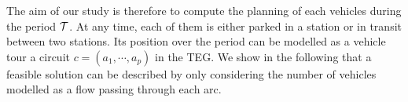 %
%
%
%

The aim of our study is therefore to compute the planning of each vehicles during the period $\mathcal{T}$. 
At any time, each of them is either parked in a station or in transit between two stations.
Its position over the period can be modelled as a vehicle tour \ie a circuit $c=(a_1,\cdots, a_p)$ in the TEG.
We show in the following that a feasible solution can be described by only considering the number of vehicles modelled as a flow passing through each arc.

